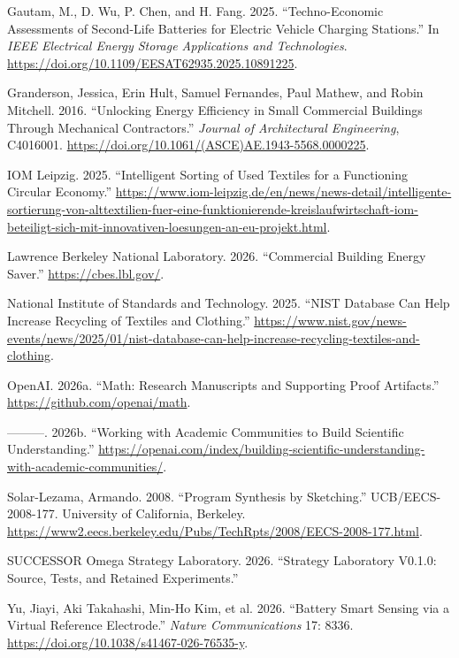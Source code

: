 \begin{CSLReferences}{1}{0}
Gautam, M., D. Wu, P. Chen, and H. Fang. 2025. {``Techno-Economic
Assessments of Second-Life Batteries for Electric Vehicle Charging
Stations.''} In \emph{IEEE Electrical Energy Storage Applications and
Technologies}. \url{https://doi.org/10.1109/EESAT62935.2025.10891225}.

Granderson, Jessica, Erin Hult, Samuel Fernandes, Paul Mathew, and Robin
Mitchell. 2016. {``Unlocking Energy Efficiency in Small Commercial
Buildings Through Mechanical Contractors.''} \emph{Journal of
Architectural Engineering}, C4016001.
\url{https://doi.org/10.1061/(ASCE)AE.1943-5568.0000225}.

IOM Leipzig. 2025. {``Intelligent Sorting of Used Textiles for a
Functioning Circular Economy.''}
\url{https://www.iom-leipzig.de/en/news/news-detail/intelligente-sortierung-von-alttextilien-fuer-eine-funktionierende-kreislaufwirtschaft-iom-beteiligt-sich-mit-innovativen-loesungen-an-eu-projekt.html}.

Lawrence Berkeley National Laboratory. 2026. {``Commercial Building
Energy Saver.''} \url{https://cbes.lbl.gov/}.

National Institute of Standards and Technology. 2025. {``NIST Database
Can Help Increase Recycling of Textiles and Clothing.''}
\url{https://www.nist.gov/news-events/news/2025/01/nist-database-can-help-increase-recycling-textiles-and-clothing}.

OpenAI. 2026a. {``Math: Research Manuscripts and Supporting Proof
Artifacts.''} \url{https://github.com/openai/math}.

---------. 2026b. {``Working with Academic Communities to Build
Scientific Understanding.''}
\url{https://openai.com/index/building-scientific-understanding-with-academic-communities/}.

Solar-Lezama, Armando. 2008. {``Program Synthesis by Sketching.''}
UCB/EECS-2008-177. University of California, Berkeley.
\url{https://www2.eecs.berkeley.edu/Pubs/TechRpts/2008/EECS-2008-177.html}.

SUCCESSOR Omega Strategy Laboratory. 2026. {``Strategy Laboratory
V0.1.0: Source, Tests, and Retained Experiments.''}

Yu, Jiayi, Aki Takahashi, Min-Ho Kim, et al. 2026. {``Battery Smart
Sensing via a Virtual Reference Electrode.''} \emph{Nature
Communications} 17: 8336.
\url{https://doi.org/10.1038/s41467-026-76535-y}.

\end{CSLReferences}
